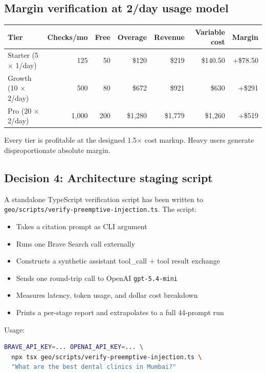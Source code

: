 \documentclass[11pt,letterpaper]{article}
\newcommand{\good}[1]{\textcolor{good}{#1}}
\begin{document}
\subsection{Margin verification at 2/day usage model}

\begin{center}
\begin{tabular}{@{}lrrrrrr@{}}
\toprule
\textbf{Tier} & \textbf{Checks/mo} & \textbf{Free} & \textbf{Overage} & \textbf{Revenue} & \textbf{Variable cost} & \textbf{Margin} \\
\midrule
Starter (5 $\times$ 1/day)  & 125   & 50  & \$120  & \$219  & \$140.50 & \good{+\$78.50} \\
Growth (10 $\times$ 2/day)  & 500   & 80  & \$672  & \$921  & \$630    & \good{+\$291} \\
Pro (20 $\times$ 2/day)     & 1,000 & 200 & \$1,280 & \$1,779 & \$1,260  & \good{+\$519} \\
\bottomrule
\end{tabular}
\end{center}

Every tier is profitable at the designed 1.5$\times$ cost markup. Heavy
users generate disproportionate absolute margin.

\subsection{Decision 4: Architecture staging script}

A standalone TypeScript verification script has been written to
\texttt{geo/scripts/verify-preemptive-injection.ts}. The script:

\begin{itemize}[nosep]
  \item Takes a citation prompt as CLI argument
  \item Runs one Brave Search call externally
  \item Constructs a synthetic assistant tool\_call $+$ tool result exchange
  \item Sends one round-trip call to OpenAI \texttt{gpt-5.4-mini}
  \item Measures latency, token usage, and dollar cost breakdown
  \item Prints a per-stage report and extrapolates to a full 44-prompt run
\end{itemize}

Usage:

\begin{lstlisting}[language=bash]
BRAVE_API_KEY=... OPENAI_API_KEY=... \
  npx tsx geo/scripts/verify-preemptive-injection.ts \
  "What are the best dental clinics in Mumbai?"
\end{lstlisting}
\end{document}
